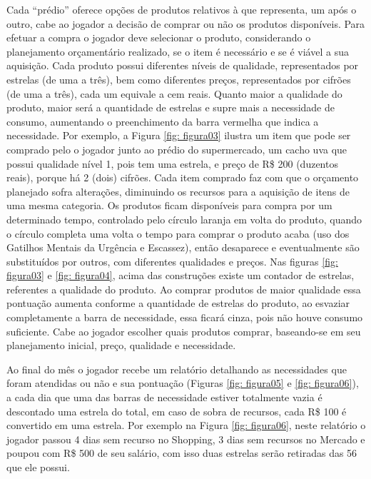 Cada “prédio” oferece opções de produtos relativos à que representa, um após o outro, cabe ao jogador a decisão de comprar ou não os produtos disponíveis. Para efetuar a compra o jogador deve selecionar o produto, considerando o planejamento orçamentário realizado, se o item é necessário e se é viável a sua aquisição. Cada produto possui diferentes níveis de qualidade, representados por estrelas (de uma a três), bem como diferentes preços, representados por cifrões (de uma a três), cada um equivale a cem reais. Quanto maior a qualidade do produto, maior será a quantidade de estrelas e supre mais a necessidade de consumo, aumentando o preenchimento da barra vermelha que indica a necessidade. Por exemplo, a Figura \ref{fig: figura03} ilustra um item que pode ser comprado pelo o jogador junto ao prédio do supermercado, um cacho uva que possui qualidade nível 1, pois tem uma estrela, e preço de R\$ 200 (duzentos reais), porque há 2 (dois) cifrões. Cada item comprado faz com que o orçamento planejado sofra alterações, diminuindo os recursos para a aquisição de itens de uma mesma categoria. Os produtos ficam disponíveis para compra por um determinado tempo, controlado pelo círculo laranja em volta do produto, quando o círculo completa uma volta o tempo para comprar o produto acaba (uso dos Gatilhos Mentais da Urgência e Escassez), então desaparece e eventualmente são substituídos por outros, com diferentes qualidades e preços. Nas figuras \ref{fig: figura03} e \ref{fig: figura04}, acima das construções existe um contador de estrelas, referentes a qualidade do produto. Ao comprar produtos de maior qualidade essa pontuação aumenta conforme a quantidade de estrelas do produto, ao esvaziar completamente a barra de necessidade, essa ficará cinza, pois não houve consumo suficiente. Cabe ao jogador escolher quais produtos comprar, baseando-se em seu planejamento inicial, preço, qualidade e necessidade.

Ao final do mês o jogador recebe um relatório detalhando as necessidades que foram atendidas ou não e sua pontuação (Figuras \ref{fig: figura05} e \ref{fig: figura06}), a cada dia que uma das barras de necessidade estiver totalmente vazia é descontado uma estrela do total, em caso de sobra de recursos, cada R\$ 100 é convertido em uma estrela. Por exemplo na Figura \ref{fig: figura06}, neste relatório o jogador passou 4 dias sem recurso no Shopping, 3 dias sem recursos no Mercado e poupou com R\$ 500 de seu salário, com isso duas estrelas serão retiradas das 56 que ele possui.

